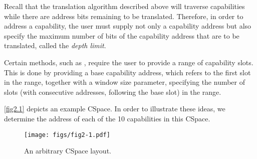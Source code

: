 Recall that the translation algorithm described above will traverse
 capabilities while there are address bits remaining to be
translated. Therefore, in order to address a  capability,
the user must supply not only a capability address but also specify
the maximum number of bits of the capability address that are to be
translated, called the \emph{depth limit}.

Certain methods, such as
, require the user to
provide a range of capability slots. This is done by providing a base
capability address, which refers to the first slot in the range,
together with a window size parameter, specifying the number of slots
(with consecutive addresses, following the base slot) in the range.


\autoref{fig2.1} depicts an example CSpace. In order to illustrate
these ideas, we determine the address of each of the 10 capabilities
in this CSpace.

\begin{figure}[tb]
  \begin{center}
    \texttt{[image: figs/fig2-1.pdf]}
    \caption{An arbitrary CSpace layout.}
    \label{fig2.1}
  \end{center}
\end{figure}


